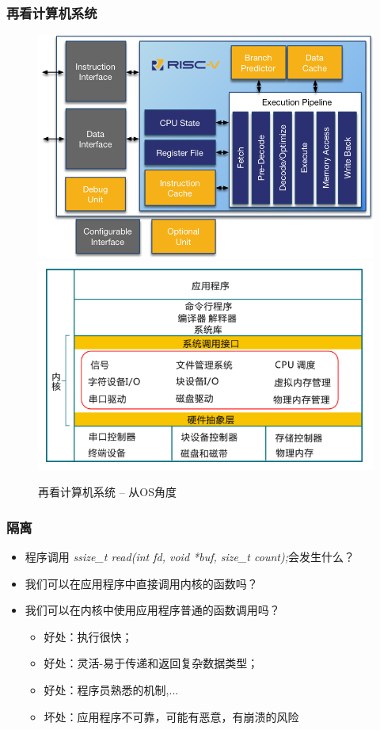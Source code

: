\documentclass[UTF8]{ctexbeamer}
\begin{document}
\begin{frame}

\frametitle{再看计算机系统}

\begin{figure}
	\centering
	\includegraphics[width=0.45\linewidth]{rv-arch}
	\includegraphics[width=0.45\linewidth]{ucore-arch}	
	\caption{再看计算机系统 -- 从OS角度}
\end{figure}


\end{frame}




\begin{frame}
	\frametitle{隔离}
	\begin{itemize}
		\item 程序调用 \textit{ssize\_t read(int fd, void *buf, size\_t count);}会发生什么？
		\item 我们可以在应用程序中直接调用内核的函数吗？
		\item 我们可以在内核中使用应用程序普通的函数调用吗？
		\begin{itemize}
			\item 好处：执行很快；
			\item 好处：灵活-易于传递和返回复杂数据类型；
			\item 好处：程序员熟悉的机制,...
			\item 坏处：应用程序不可靠，可能有恶意，有崩溃的风险
			
		\end{itemize}
	\end{itemize}
\end{frame}
\end{document}
